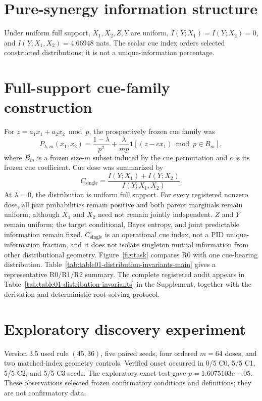 \documentclass[11pt]{article}
\begin{document}
\section{Pure-synergy information structure}
Under uniform full support, $X_1,X_2,Z,Y$ are uniform,
$I(Y;X_1)=I(Y;X_2)=0$, and
$I(Y;X_1,X_2)=4.66948$ nats. The scalar cue index orders
selected constructed distributions; it is not a unique-information percentage.

\section{Full-support cue-family construction}
For $z=a_1x_1+a_2x_2 \bmod p$, the prospectively frozen cue family was
\[
P_{\lambda,m}(x_1,x_2)
=\frac{1-\lambda}{p^2}
+\frac{\lambda}{mp}
\mathbf{1}\!\left[(z-cx_1)\bmod p\in B_m\right],
\]
where $B_m$ is a frozen size-$m$ subset induced by the cue permutation and
$c$ is its frozen cue coefficient. Cue dose was summarized by
\[
C_{\mathrm{single}}
=\frac{I(Y;X_1)+I(Y;X_2)}{I(Y;X_1,X_2)}.
\]
At $\lambda=0$, the distribution is uniform full support. For every
registered nonzero dose, all pair probabilities remain positive and both
parent marginals remain uniform, although $X_1$ and $X_2$ need not remain
jointly independent. $Z$ and $Y$ remain uniform; the target conditional,
Bayes entropy, and joint predictable information remain fixed.
$C_{\mathrm{single}}$ is an operational cue index, not a PID
unique-information fraction, and it does not isolate singleton mutual
information from other distributional geometry. Figure~\ref{fig:task}
compares R0 with one cue-bearing distribution.
Table~\ref{tab:table01-distribution-invariants-main} gives a representative
R0/R1/R2 summary. The complete registered audit appears in
Table~\ref{tab:table01-distribution-invariants} in the Supplement, together
with the derivation and deterministic root-solving protocol.



\section{Exploratory discovery experiment}
Version 3.5 used rule $(45,36)$, five paired seeds, four ordered $m=64$ doses,
and two matched-index geometry controls. Verified onset occurred in
0/5 C0, 5/5 C1, 5/5 C2, and
5/5 C3 seeds. The exploratory exact test gave
$p=1.6075103e-05$. These observations selected frozen
confirmatory conditions and definitions; they are not confirmatory data.
\end{document}
